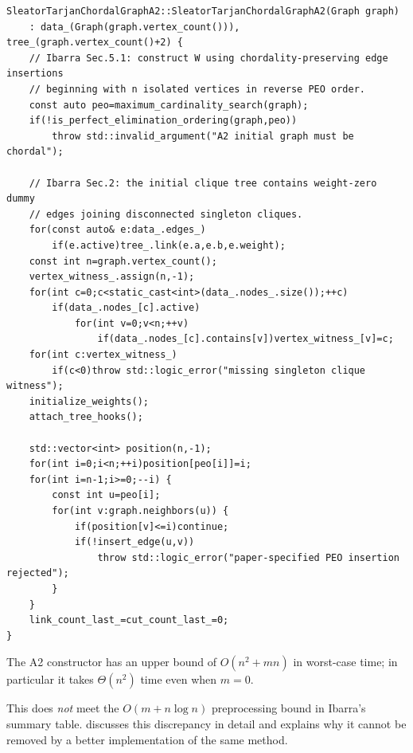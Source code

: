 \documentclass[11pt,a4paper,oneside]{report}
\theoremstyle{plain}
\theoremstyle{definition}
\theoremstyle{remark}
\DeclareRobustCommand{\file}[1]{\mtp_breakable_tt:n {#1}}
\begin{document}
\begin{lstlisting}[style=cpp,firstnumber=11,caption={\file{src/dynamic_ibarra_a2.cpp}, lines 11--45: the A2 constructor (replay of the edges in reverse PEO order).},label={lst:a2-ctor}]
SleatorTarjanChordalGraphA2::SleatorTarjanChordalGraphA2(Graph graph)
    : data_(Graph(graph.vertex_count())), tree_(graph.vertex_count()+2) {
    // Ibarra Sec.5.1: construct W using chordality-preserving edge insertions
    // beginning with n isolated vertices in reverse PEO order.
    const auto peo=maximum_cardinality_search(graph);
    if(!is_perfect_elimination_ordering(graph,peo))
        throw std::invalid_argument("A2 initial graph must be chordal");

    // Ibarra Sec.2: the initial clique tree contains weight-zero dummy
    // edges joining disconnected singleton cliques.
    for(const auto& e:data_.edges_)
        if(e.active)tree_.link(e.a,e.b,e.weight);
    const int n=graph.vertex_count();
    vertex_witness_.assign(n,-1);
    for(int c=0;c<static_cast<int>(data_.nodes_.size());++c)
        if(data_.nodes_[c].active)
            for(int v=0;v<n;++v)
                if(data_.nodes_[c].contains[v])vertex_witness_[v]=c;
    for(int c:vertex_witness_)
        if(c<0)throw std::logic_error("missing singleton clique witness");
    initialize_weights();
    attach_tree_hooks();

    std::vector<int> position(n,-1);
    for(int i=0;i<n;++i)position[peo[i]]=i;
    for(int i=n-1;i>=0;--i) {
        const int u=peo[i];
        for(int v:graph.neighbors(u)) {
            if(position[v]<=i)continue;
            if(!insert_edge(u,v))
                throw std::logic_error("paper-specified PEO insertion rejected");
        }
    }
    link_count_last_=cut_count_last_=0;
}
\end{lstlisting}

\begin{proposition}\label{prop:a2-pre}
The A2 constructor has an upper bound of \(O(n^2+mn)\) in worst-case time; in particular it takes
\(\Theta(n^2)\) time even when \(m=0\).
\end{proposition}
This does \emph{not} meet the \(O(m+n\log n)\) preprocessing bound in Ibarra's summary table.
 discusses this discrepancy in detail and explains why it cannot be
removed by a better implementation of the same method.
\end{document}
